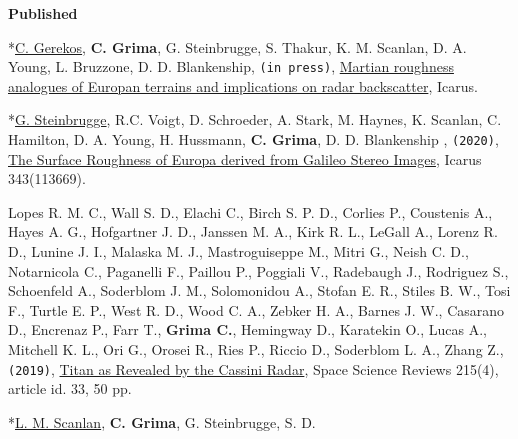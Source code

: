 \textbf{Published}
\begin{etaremune}
\def\labelenumi{\arabic{enumi}.}
\item
  *\underline{C. Gerekos}, \textbf{C. Grima}, G. Steinbrugge, S. Thakur, K. M. Scanlan, D. A. Young, L. Bruzzone, D. D. Blankenship, \texttt{(in press)}, \href{https://doi.org/10.1016/j.icarus.2020.114197}{Martian roughness analogues of Europan terrains and implications on radar backscatter}, Icarus.
\item
  *\underline{G. Steinbrugge}, R.C. Voigt, D. Schroeder, A. Stark, M. Haynes, K. Scanlan, C. Hamilton, D. A. Young, H. Hussmann, \textbf{C. Grima}, D. D. Blankenship , \texttt{(2020)}, \href{https://www.sciencedirect.com/science/article/abs/pii/S0019103519301526}{The Surface Roughness of Europa derived from Galileo Stereo Images}, Icarus 343(113669).
\item
  Lopes R. M. C., Wall S. D., Elachi C., Birch S. P. D., Corlies P.,
  Coustenis A., Hayes A. G., Hofgartner J. D., Janssen M. A., Kirk R.
  L., LeGall A., Lorenz R. D., Lunine J. I., Malaska M. J.,
  Mastroguiseppe M., Mitri G., Neish C. D., Notarnicola C., Paganelli
  F., Paillou P., Poggiali V., Radebaugh J., Rodriguez S., Schoenfeld
  A., Soderblom J. M., Solomonidou A., Stofan E. R., Stiles B. W., Tosi
  F., Turtle E. P., West R. D., Wood C. A., Zebker H. A., Barnes J. W.,
  Casarano D., Encrenaz P., Farr T., \textbf{Grima C.}, Hemingway D.,
  Karatekin O., Lucas A., Mitchell K. L., Ori G., Orosei R., Ries P.,
  Riccio D., Soderblom L. A., Zhang Z., \texttt{(2019)},
  \href{https://ui.adsabs.harvard.edu/abs/2019SSRv..215...33L/abstract}{Titan
  as Revealed by the Cassini Radar}, Space Science Reviews 215(4), article id. 33, 50 pp.
\item
  *\underline{L. M. Scanlan}, \textbf{C. Grima}, G. Steinbrugge, S. D.

\end{etaremune}

